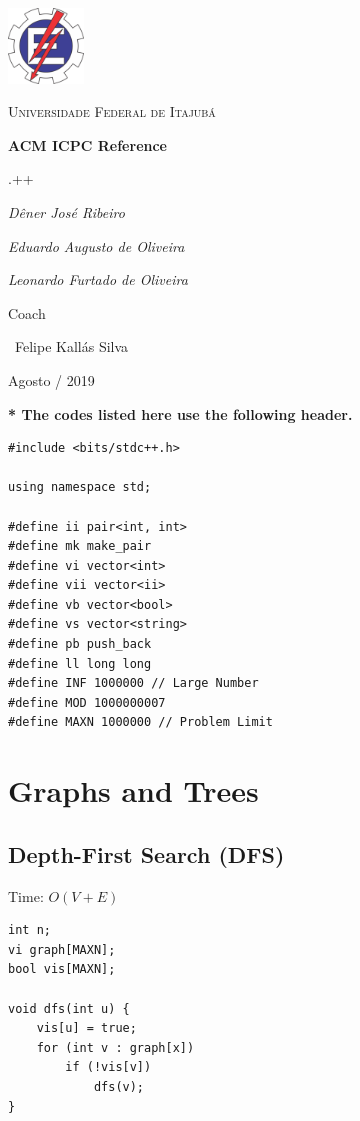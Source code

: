 \documentclass[oneside]{article}
\begin{document}
\begin{titlepage}
  \centering
  \includegraphics[width=0.15\textwidth]{logo.png}\par\vspace{1cm}
  {\scshape\LARGE Universidade Federal de Itajubá \par}
  \vspace{1.5cm}
  {\huge\bfseries ACM ICPC Reference\par}
  \vspace{2cm}
  {\scshape\Large .++\par}  
  \vspace{1cm}
  {\Large\itshape Dêner José Ribeiro\par}
  {\Large\itshape Eduardo Augusto de Oliveira\par}
  {\Large\itshape Leonardo Furtado de Oliveira\par}
  \vfill
  Coach\par
  ~Felipe Kallás Silva
  
  \vfill
  
  {\large Agosto / 2019\par}
\end{titlepage}

\thispagestyle{empty}
\tableofcontents
\pagebreak

\textbf{* The codes listed here use the following header.}
\begin{lstlisting}
#include <bits/stdc++.h>

using namespace std;

#define ii pair<int, int>
#define mk make_pair
#define vi vector<int>
#define vii vector<ii>
#define vb vector<bool>
#define vs vector<string>
#define pb push_back
#define ll long long
#define INF 1000000 // Large Number
#define MOD 1000000007
#define MAXN 1000000 // Problem Limit
\end{lstlisting}

\section{Graphs and Trees}

\subsection{Depth-First Search (DFS)}
Time: $O(V + E)$
\begin{lstlisting}
int n;
vi graph[MAXN];
bool vis[MAXN];

void dfs(int u) {
    vis[u] = true;
    for (int v : graph[x])
    	if (!vis[v])
    		dfs(v);
}
\end{lstlisting}
\end{document}
